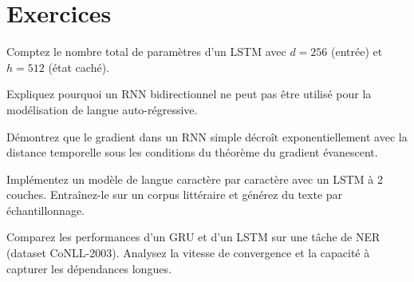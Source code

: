 \section{Exercices}
\label{sec:seq:exercices}

\begin{exercice}[$\star$]
Comptez le nombre total de param\`etres d'un LSTM avec $d = 256$ (entr\'ee)
et $h = 512$ (\'etat cach\'e).
\end{exercice}

\begin{exercice}[$\star$]
Expliquez pourquoi un RNN bidirectionnel ne peut pas \^etre utilis\'e pour
la mod\'elisation de langue auto-r\'egressive.
\end{exercice}

\begin{exercice}[$\star\star$]
D\'emontrez que le gradient dans un RNN simple d\'ecro\^it exponentiellement
avec la distance temporelle sous les conditions du th\'eor\`eme du gradient
\'evanescent.
\end{exercice}

\begin{exercice}[$\star\star$]
Impl\'ementez un mod\`ele de langue caract\`ere par caract\`ere avec un LSTM
\`a 2 couches. Entra\^inez-le sur un corpus litt\'eraire et g\'en\'erez du
texte par \'echantillonnage.
\end{exercice}

\begin{exercice}[$\star\star\star$]
Comparez les performances d'un GRU et d'un LSTM sur une t\^ache de NER
(dataset CoNLL-2003). Analysez la vitesse de convergence et la capacit\'e
\`a capturer les d\'ependances longues.
\end{exercice}
